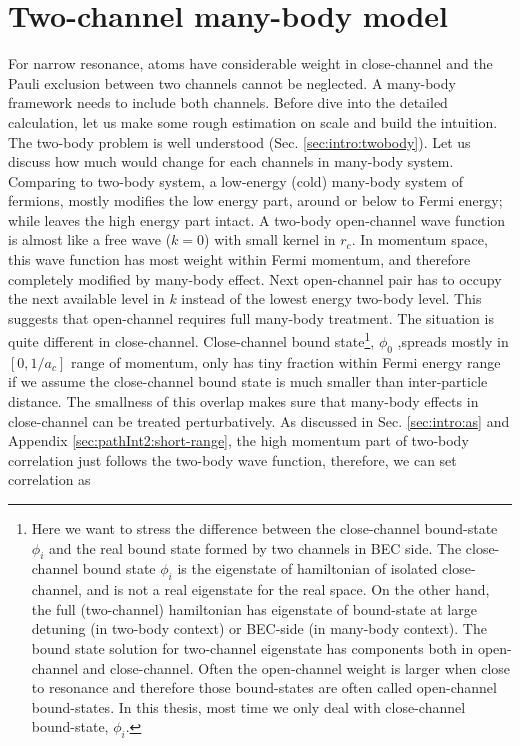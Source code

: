 
\chapter{Two-channel many-body model\label{ch:path2}}
For narrow resonance, atoms have considerable weight in close-channel and the Pauli exclusion between two channels cannot be neglected.  A many-body framework needs to include both channels.  Before dive into the detailed calculation, let us make some rough estimation on scale and build the intuition.  The two-body problem is well understood (Sec. \ref{sec:intro:twobody}).  %
Let us discuss how much would change for each channels in many-body system.  Comparing to two-body system, a low-energy (cold) many-body system of fermions, mostly modifies the low energy part, around or below to Fermi energy; while leaves the high energy part intact.  A two-body open-channel wave function is almost like a free wave ($k=0$) with small kernel in $r_c$.  In momentum space, this wave function has most weight within Fermi momentum, and therefore completely modified by many-body effect. Next open-channel pair has to occupy the next available level in $k$ instead of the lowest energy two-body level.  This suggests that open-channel requires full many-body treatment.  The situation is quite different in close-channel.  Close-channel bound state\footnote{Here we want to stress the difference between the close-channel bound-state $\phi_{i}$ and the real bound state formed by two channels in BEC side.   The close-channel bound state $\phi_{i}$ is the eigenstate of hamiltonian of isolated close-channel, and is not a real eigenstate for the real space.  On the other hand, the full (two-channel) hamiltonian has eigenstate of bound-state at large detuning (in two-body context) or BEC-side (in many-body context).  The bound state solution for two-channel eigenstate has components both in open-channel and close-channel.  Often the open-channel weight is larger when close to resonance and therefore those bound-states are often called open-channel bound-states.  In this thesis, most time we only deal with close-channel bound-state, $\phi_{i}$.},  $\phi_{0}$ ,spreads mostly in $[0,1/a_{c}]$ range of momentum, only has tiny fraction within Fermi energy range if we assume the close-channel bound state is much smaller than inter-particle distance. The smallness of this overlap makes sure that many-body effects in close-channel can be  treated perturbatively.  As discussed in Sec. \ref{sec:intro:as} and Appendix \ref{sec:pathInt2:short-range}, the high momentum part of two-body correlation just follows the two-body wave function,  therefore, we can set correlation as 

